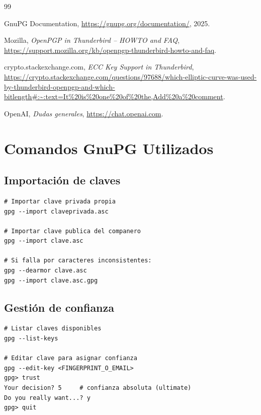 \documentclass[12pt,a4paper]{report}
\begin{document}
\begin{thebibliography}{99}

 GnuPG Documentation, \url{https://gnupg.org/documentation/}, 2025.

 Mozilla, \textit{OpenPGP in Thunderbird -- HOWTO and FAQ}, \url{https://support.mozilla.org/kb/openpgp-thunderbird-howto-and-faq}.

 crypto.stackexchange.com, \textit{ECC Key Support in Thunderbird}, \url{https://crypto.stackexchange.com/questions/97688/which-elliptic-curve-was-used-by-thunderbird-openpgp-and-which-bitlength#:~:text=It%20is%20one%20of%20the,Add%20a%20comment}.

 OpenAI, \textit{Dudas generales}, \url{https://chat.openai.com}.


\end{thebibliography}


\appendix

\chapter{Comandos GnuPG Utilizados}

\section{Importación de claves}

\begin{lstlisting}[caption=Comandos para importación de claves en GnuPG]
# Importar clave privada propia
gpg --import claveprivada.asc

# Importar clave publica del companero
gpg --import clave.asc

# Si falla por caracteres inconsistentes:
gpg --dearmor clave.asc
gpg --import clave.asc.gpg
\end{lstlisting}

\section{Gestión de confianza}

\begin{lstlisting}[caption=Asignación de confianza máxima a una clave]
# Listar claves disponibles
gpg --list-keys

# Editar clave para asignar confianza
gpg --edit-key <FINGERPRINT_O_EMAIL>
gpg> trust
Your decision? 5     # confianza absoluta (ultimate)
Do you really want...? y
gpg> quit
\end{lstlisting}
\end{document}
